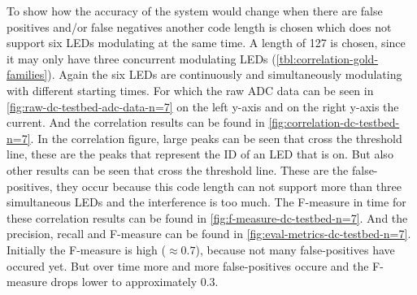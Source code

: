 To show how the accuracy of the system would change when there are false positives and/or false negatives another code length is chosen which does not support six LEDs modulating at the same time.
A length of 127 is chosen, since it may only have three concurrent modulating LEDs (\autoref{tbl:correlation-gold-families}).
Again the six LEDs are continuously and simultaneously modulating with different starting times.
For which the raw ADC data can be seen in \autoref{fig:raw-dc-testbed-adc-data-n=7} on the left y-axis and on the right y-axis the current.
And the correlation results can be found in \autoref{fig:correlation-dc-testbed-n=7}.
In the correlation figure, large peaks can be seen that cross the threshold line, these are the peaks that represent the ID of an LED that is on.
But also other results can be seen that cross the threshold line.
These are the false-positives, they occur because this code length can not support more than three simultaneous LEDs and the interference is too much.
The F-measure in time for these correlation results can be found in \autoref{fig:f-measure-dc-testbed-n=7}.
And the precision, recall and F-measure can be found in \autoref{fig:eval-metrics-dc-testbed-n=7}.
Initially the F-measure is high ($\approx 0.7$), because not many false-positives have occured yet.
But over time more and more false-positives occure and the F-measure drops lower to approximately 0.3.






